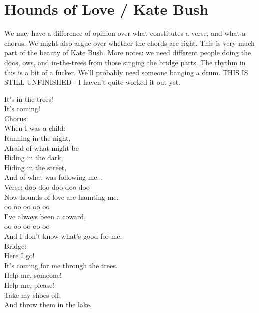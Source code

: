 \section{Hounds of Love / Kate Bush}\label{sec:hounds_of_love}
  {\small We may have a difference of opinion over what constitutes a verse, and what a chorus. We might also argue over whether the chords are right. This is very much part of the beauty of Kate Bush. More notes: we need different people doing the doos, ows, and in-the-trees from those singing the bridge parts. The rhythm in this is a bit of a fucker. We'll probably need someone banging a drum. THIS IS STILL UNFINISHED - I haven't quite worked it out yet.}
  
  \Fmajor
  \Cmajor
  \BflatMajor
  \Aminor
  
  It's in the trees!\\
  It's coming!\\
  Chorus:\\
  When I was a child:\\
  Running in the night,\\
  Afraid of what might be\\
  Hiding in the dark,\\
  Hiding in the street,\\
  And of what was following me...\\
  Verse:
  doo doo doo doo doo\\
  Now hounds of love are haunting me. \\
  oo oo oo oo oo \\
  I've always been a coward,\\
  oo oo oo oo oo \\
  And I don't know what's good for me.\\
  Bridge:\\
  Here I go!\\
  It's coming for me through the trees.\\
  Help me, someone!\\
  Help me, please!\\
  Take my shoes off,\\
  And throw them in the lake,\\
